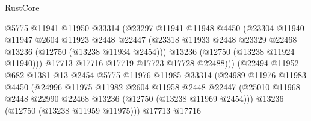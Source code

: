\begin{lexlean}{RustCore}
\begin{coremodule}
                                @5775
                                @11941
                                @11950
                                @33314
                                (@23297
                                  @11941
                                  @11948
                                  @4450
                                  (@23304
                                    @11940
                                    @11947
                                    @2604
                                    @11923
                                    @2448
                                    @22447
                                    (@23318
                                      @11933
                                      @2448
                                      @23329
                                      @22468
                                      @13236
                                      (@12750 (@13238 @11934 @2454)))
                                    @13236
                                    (@12750 (@13238 @11924 @11940)))
                                  @17713
                                  @17716
                                  @17719
                                  @17723
                                  @17728
                                  @22488)))
                            (@22494
                              @11952
                              @682
                              @1381
                              @13
                              @2454
                              @5775
                              @11976
                              @11985
                              @33314
                              (@24989
                                @11976
                                @11983
                                @4450
                                (@24996
                                  @11975
                                  @11982
                                  @2604
                                  @11958
                                  @2448
                                  @22447
                                  (@25010
                                    @11968
                                    @2448
                                    @22990
                                    @22468
                                    @13236
                                    (@12750 (@13238 @11969 @2454)))
                                  @13236
                                  (@12750 (@13238 @11959 @11975)))
                                @17713
                                @17716

\end{coremodule}
\end{lexlean}
